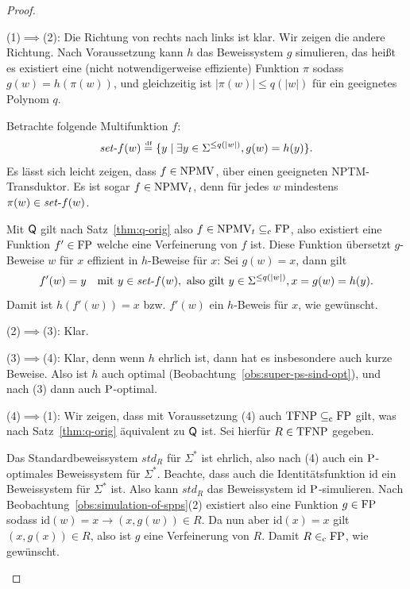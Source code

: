 \begin{proof}
    \begin{prooflist}
    \item (1)$\implies$(2): Die Richtung von rechts nach links ist klar. Wir zeigen die andere Richtung. Nach Voraussetzung kann $h$ das Beweissystem $g$ simulieren, das heißt es existiert eine (nicht notwendigerweise effiziente) Funktion $\pi$ sodass $g(w)=h(\pi(w))$, und gleichzeitig ist $|\pi(w)|\leq q(|w|)$ für ein geeignetes Polynom $q$.

Betrachte folgende Multifunktion $f$:
\[ \fset{}f(w) \defeq  \{ y \mid \exists y\in\Sigma^{\leq q(|w|)}, g(w)=h(y) \}. \]
Es lässt sich leicht zeigen, dass $f\in\NPMV$, über einen geeigneten NPTM-Transduktor. 
Es ist sogar $f\in\NPMV_t$, denn für jedes $w$ mindestens $\pi(w)\in \fset{}f(w)$.

Mit $\hQ$ gilt nach Satz~\ref{thm:q-orig} also $f\in\NPMV_t\subseteqc \FP$, also existiert eine Funktion $f'\in\FP$ welche eine Verfeinerung von $f$ ist. Diese Funktion übersetzt $g$-Beweise $w$ für $x$ effizient in $h$-Beweise für $x$: 
Sei $g(w)=x$, dann gilt
\[ f'(w) = y \quad\text{mit } y\in\fset{}f(w), \text{ also gilt } y\in\Sigma^{\leq q(|w|)}, x=g(w)=h(y). \]
Damit ist $h(f'(w))=x$ bzw. $f'(w)$ ein $h$-Beweis für $x$, wie gewünscht.

\item (2)$\implies$(3): Klar.

\item (3)$\implies$(4): Klar, denn wenn $h$ ehrlich ist, dann hat es insbesondere auch kurze Beweise. Also ist $h$ auch optimal (Beobachtung~\ref{obs:super-ps-sind-opt}), und nach (3) dann auch $\P$-optimal.

\item (4)$\implies$(1): Wir zeigen, dass mit Voraussetzung (4) auch $\TFNP\subseteqc \FP$ gilt, was nach Satz~\ref{thm:q-orig} äquivalent zu $\hQ$ ist. Sei hierfür $R\in\TFNP$ gegeben.

    Das Standardbeweissystem $\mathit{std}_R$ für $\Sigma^*$ ist ehrlich, also nach (4) auch ein $\P$-optimales Beweissystem für $\Sigma^*$. Beachte, dass auch die Identitätsfunktion $\mathrm{id}$ ein Beweissystem für $\Sigma^*$ ist. Also kann $\mathit{std}_R$ das Beweissystem $\mathrm{id}$ $\P$-simulieren. Nach Beobachtung~\ref{obs:simulation-of-spps}(2) existiert also eine Funktion $g\in\FP$ sodass $\mathrm{id}(w)=x\rightarrow (x, g(w))\in R$. Da nun aber $\mathrm{id}(x)=x$ gilt $(x, g(x))\in R$, also ist $g$ eine Verfeinerung von $R$. Damit $R\inc\FP$, wie gewünscht.
    \end{prooflist}
\end{proof}

